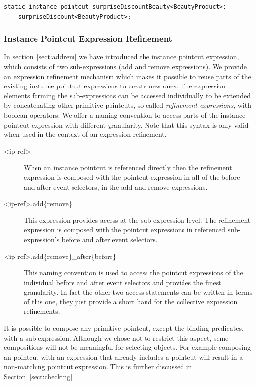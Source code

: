 \begin{lstlisting}[float=h!, caption={A type refined pointcut},label={lst:typeref}]
static instance pointcut surpriseDiscountBeauty<BeautyProduct>:
	surpriseDiscount<BeautyProduct>;
\end{lstlisting}

\subsubsection{Instance Pointcut Expression Refinement}
In section~\ref{sect:addrem} we have introduced the instance pointcut expression, which consists of two sub-expressions (add and remove expressions).
We provide an expression refinement mechanism which makes it possible to reuse parts of the existing instance pointcut expressions to create new ones.
The expression elements forming the sub-expressions can be accessed individually to be extended by concatenating other primitive pointcuts, so-called \emph{refinement expressions}, with boolean operators.
We offer a naming convention to access parts of the instance pointcut expression with different granularity. Note that this syntax is only valid when used in the context of an expression refinement.
\begin{description}
\item[<ip-ref>]When an instance pointcut is referenced directly then the refinement expression is composed with the pointcut expression in all of the before and after event selectors, in the add and remove expressions.
\item[<ip-ref>.add\{remove\}] This expression provides access at the sub-expression level. The refinement expression is composed with the pointcut expressions in referenced sub-expression's before and after event selectors.
\item[<ip-ref>.add\{remove\}_after\{before\}] This naming convention is used to access the pointcut expressions of the individual before and after event selectors and provides the finest granularity. In fact the other two access statements can be written in terms of this one, they just provide a short hand for the collective expression refinements.
\end{description}

It is possible to compose any primitive pointcut, except the binding predicates, with a sub-expression. Although we chose not to restrict this aspect, some compositions will not be meaningful for selecting objects. For example composing an  pointcut with an expression that already includes a  pointcut will result in a non-matching pointcut expression. This is further discussed in Section~\ref{sect:checking}.

